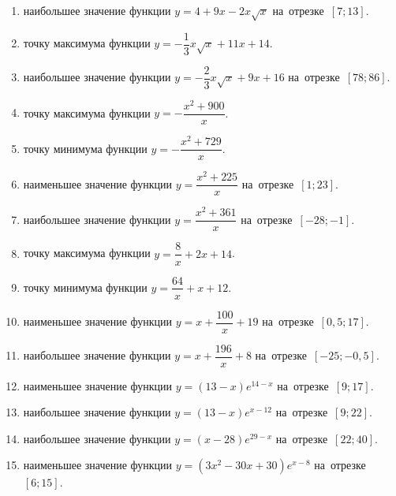 \documentclass[a4paper,10pt]{article}
\begin{document}
\begin{enumerate}
\item {} наибольшее значение функции $y=4+9x -2x\sqrt{x}$ на~отрезке~$\left[7;13\right]$.

\item {} точку максимума функции $y=-\dfrac{1}{3}x\sqrt{x} +11x+14$.

\item {} наибольшее значение функции $y=-\dfrac{2}{3}x\sqrt{x} +9x+16$ на~отрезке~$\left[78;86\right]$.

\item {} точку максимума функции $y=-\dfrac{x^2 +900}{x}$.

\item {} точку минимума функции $y=-\dfrac{x^2 +729}{x}$.

\item {} наименьшее значение функции $y=\dfrac{x^2 +225}{x}$ на~отрезке~$\left[1;23\right]$.

\item {} наибольшее значение функции $y=\dfrac{x^2 +361}{x}$ на~отрезке~$\left[-28;-1\right]$.

\item {} точку максимума функции $y=\dfrac{8}{x} +2x+14$.

\item {} точку минимума функции $y=\dfrac{64}{x} +x+12$.

\item {} наименьшее значение функции $y=x+\dfrac{100}{x} +19$ на~отрезке~$\left[0,5;17\right]$.

\item {} наибольшее значение функции $y=x+\dfrac{196}{x} +8$ на~отрезке~$\left[-25;-0,5\right]$.

\item {} наименьшее значение функции $y=\left(13-x\right)e^{14-x}$ на~отрезке~$\left[9;17\right]$.

\item {} наибольшее значение функции $y=\left(13-x\right)e^{x-12}$ на~отрезке~$\left[9;22\right]$.

\item {} наибольшее значение функции $y=\left(x-28\right)e^{29-x}$ на~отрезке~$\left[22;40\right]$.

\item {} наименьшее значение функции $y=\left(3x^2 -30x +30\right)e^{x -8}$ на~отрезке~$\left[6;15\right]$.


\end{enumerate}
\end{document}
